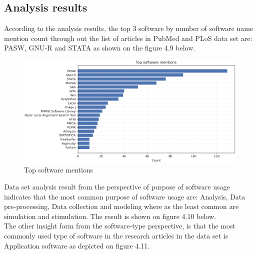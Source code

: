 \subsection{Analysis results }
\label{subsec:dataset:Analysis:results}

According to the analysis results, the top 3 software by number of software name mention count through out the list of articles in PubMed and PLoS data set are: PASW, GNU-R and STATA as shown on the figure 4.9 below. 

\begin{figure}[htbp]
	\centering
	\includegraphics[width=.90\textwidth]{4.graphics/figures/ch_4/analysisresults/1.Top software mentions}
	\caption{Top software mentions}
	\label{fig:chapter03:setup}
\end{figure}

Data set analysis result from the perspective of purpose of software usage indicates that the most common purpose of software usage are: Analysis, Data pre-processing, Data collection and modeling where as the least common are simulation and stimulation. The result is shown on figure 4.10 below. \\

The other insight form from  the software-type perspective, is that the most commonly used type of software in the research articles in the data set is Application software as depicted on figure 4.11. \\

